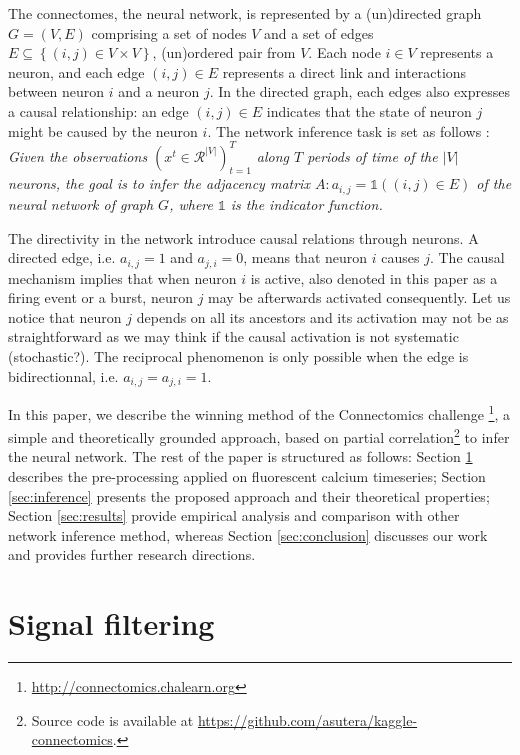 \documentclass[wcp]{jmlr}
\begin{document}
The connectomes, the neural network, is represented by a (un)directed graph $G = (V, E)$ comprising
a set of nodes $V$ and a set of edges $E \subseteq \left\{(i, j) \in V \times
V\right\}$, (un)ordered pair from $V$.
Each node $i \in V$ represents a neuron, and each edge $(i, j) \in E$
represents a direct link and interactions between neuron $i$ and a neuron $j$.
In the directed graph, each edges also expresses a causal relationship: an
edge $(i, j) \in E$ indicates that the state of neuron $j$ might be caused
by the neuron $i$. The network inference task is set as follows :
\textit{Given the observations $(x^t \in \mathcal{R}^{|V|})_{t=1}^T $
along $T$ periods of time of the $|V|$ neurons, the goal is to infer the
adjacency matrix $A : a_{i,j} = \mathbb{1}((i, j) \in E)$ of the neural network
of graph $G$, where $\mathbb{1}$ is the indicator function.}

The directivity in the network introduce causal relations through neurons. A
directed edge, i.e. $a_{i,j} = 1$ and $a_{j,i} = 0$, means that neuron $i$
causes $j$. The causal mechanism implies that when neuron $i$ is active, also
denoted in this paper as a firing event or a burst, neuron $j$ may be
afterwards activated consequently. Let us notice that neuron $j$ depends on
all its ancestors and its activation may not be as straightforward as we may
think if the causal activation is not systematic (stochastic?). The reciprocal
phenomenon is only possible when the edge is bidirectionnal, i.e. $a_{i,j} =
a_{j,i} = 1$.

In this paper, we describe the winning method of the Connectomics challenge
\footnote{\url{http://connectomics.chalearn.org}}, a simple and theoretically
grounded approach, based on partial correlation\footnote{Source code is available
at \url{https://github.com/asutera/kaggle-connectomics}.} to infer the neural
network. The rest of the paper is structured as follows: Section \ref{sec:filter}
describes the pre-processing applied on fluorescent calcium timeseries;
Section \ref{sec:inference} presents the proposed approach and
their theoretical properties; Section \ref{sec:results} provide
empirical analysis and comparison with other network inference method,
whereas Section \ref{sec:conclusion} discusses our work and provides further
research directions.


\section{Signal filtering} \label{sec:filter}
\end{document}
